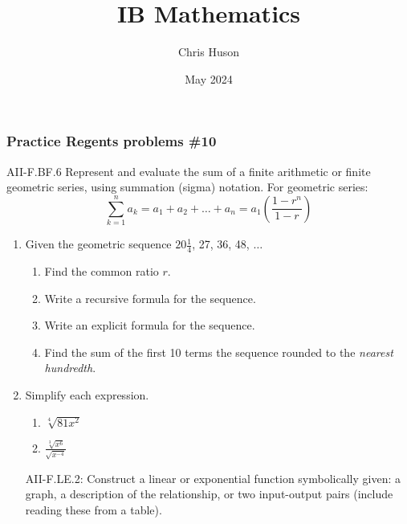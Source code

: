 \documentclass[12pt, twoside]{article}
\title{IB Mathematics}
\author{Chris Huson}
\date{May 2024}
\begin{document}
\subsubsection*{Practice Regents problems \#10}
AII-F.BF.6 Represent and evaluate the sum of a finite arithmetic
or finite geometric series, using summation (sigma) notation. For geometric series:
$$\sum_{k=1}^{n} a_k = a_1 + a_2 + \ldots + a_n = a_1 \left( \frac{1-r^n}{1-r} \right)$$

\begin{enumerate}
\item Given the geometric sequence $20 \frac{1}{4}$, 27, 36, 48, $\ldots$
\begin{enumerate}[itemsep=2cm]
    \item Find the common ratio $r$.
    \item Write a recursive formula for the sequence.
    \item Write an explicit formula for the sequence.
    \item Find the sum of the first 10 terms the sequence rounded to the \emph{nearest hundredth}.
\end{enumerate} \vspace{3cm}

\item Simplify each expression. 
\begin{multicols}{2}
    \begin{enumerate}
        \item $\sqrt[4]{81x^2}$
        \item $\displaystyle \frac{\sqrt[3]{x^{6}}}{\sqrt{x^{-4}}}$
    \end{enumerate}
\end{multicols}
\vspace{3cm}

\newpage
AII-F.LE.2: Construct a linear or exponential function symbolically given: a graph, a description of the relationship, or two input-output pairs (include reading these from a table).


\end{enumerate}
\end{document}
